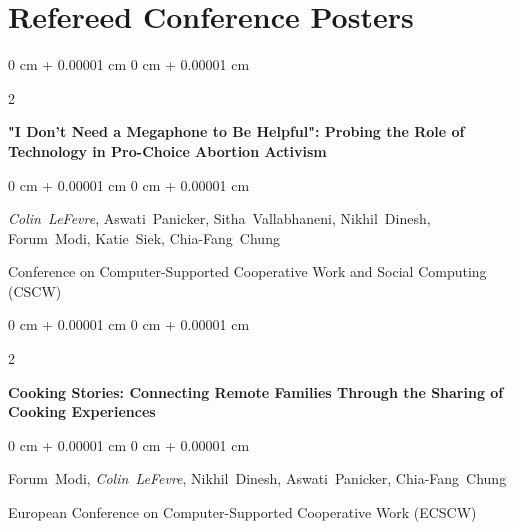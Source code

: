 \documentclass[10pt, letterpaper]{article}
\newenvironment{onecolentry}{
    \begin{adjustwidth}{
        0 cm + 0.00001 cm
    }{
        0 cm + 0.00001 cm
    }
}{
    \end{adjustwidth}
} %
\newenvironment{twocolentry}[2][]{
    \onecolentry
    \def\secondColumn{#2}
    \setcolumnwidth{\fill, 4.5 cm}
    \begin{paracol}{2}
}{
    \switchcolumn \raggedleft \secondColumn
    \end{paracol}
    \endonecolentry
} %
\begin{document}
    
    \section{Refereed Conference Posters}



        
        \begin{samepage}
            \begin{twocolentry}{
                2023
            }
                \textbf{"I Don’t Need a Megaphone to Be Helpful": Probing the Role of Technology in Pro-Choice Abortion Activism}
            \end{twocolentry}

            \vspace{0.10 cm}
            
            \begin{onecolentry}
                \mbox{\textit{Colin LeFevre}}, \mbox{Aswati Panicker}, \mbox{Sitha Vallabhaneni}, \mbox{Nikhil Dinesh}, \mbox{Forum Modi}, \mbox{Katie Siek}, \mbox{Chia-Fang Chung}

                \vspace{0.10 cm}
                
        Conference on Computer-Supported Cooperative Work and Social Computing (CSCW)\end{onecolentry}
        \end{samepage}

        \vspace{0.2 cm}

        \begin{samepage}
            \begin{twocolentry}{
                2022
            }
                \textbf{Cooking Stories: Connecting Remote Families Through the Sharing of Cooking Experiences}
            \end{twocolentry}

            \vspace{0.10 cm}
            
            \begin{onecolentry}
                \mbox{Forum Modi}, \mbox{\textit{Colin LeFevre}}, \mbox{Nikhil Dinesh}, \mbox{Aswati Panicker}, \mbox{Chia-Fang Chung}

                \vspace{0.10 cm}
                
        European Conference on Computer-Supported Cooperative Work (ECSCW)\end{onecolentry}
        \end{samepage}
\end{document}
